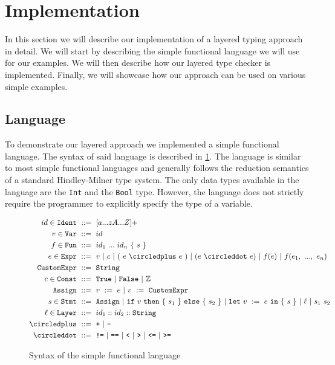 \section{Implementation}
\label{sec:implementation}

In this section we will describe our implementation of a layered typing approach in detail. We will start by describing the simple functional language we will use for our examples. We will then describe how our layered type checker is implemented. Finally, we will showcase how our approach can be used on various simple examples.

\subsection{Language}
\label{ssec:language}

To demonstrate our layered approach we implemented a simple functional language. The syntax of said language is described in \ref{fig:lang}. The language is similar to most simple functional languages and generally follows the reduction semantics of a standard Hindley-Milner type system. The only data types available in the language are the \texttt{Int} and the \texttt{Bool} type. However, the language does not strictly require the programmer to explicitly specify the type of a variable.

\begin{figure}[ht!]
\begin{align*}
	id \in \texttt{Ident}\ 	&::=\ [a...zA...Z]+ \\
	v \in \texttt{Var}\ 	&::=\ id \\
	f \in \texttt{Fun}\ 	&::=\ id_1\ ...\ id_n\ \{\ s\ \}\\
	e \in \texttt{Expr}\ 	&::=\ v\ |\ c\ |\ (\ e\ \circledplus\ e\ )\ |\ (e\ \circleddot\ e)\ |\ f(e)\ |\ f(e_1,\ ...,\ e_n)  \\
	\texttt{CustomExpr}\ 	&::=\ \texttt{String}\\
	c \in \texttt{Const}\ 	&::=\ \texttt{True}\ |\ \texttt{False}\ |\ \mathbb{Z} \\
	\texttt{Assign}\ 	&::=\ v\ :=\ e\ |\ v\ :=\ \texttt{CustomExpr}\ \\
	s \in \texttt{Stmt}\ 	&::=\ \texttt{Assign}\ |\ \texttt{if}\ v\ \texttt{then}\ \lbrace\ s_1\ \rbrace\ \texttt{else}\ \lbrace\ s_2\ \rbrace\ |\ \texttt{let}\ v\ :=\ e\ \texttt{in}\ \lbrace\ s\ \rbrace\ |\ \ell\ |\ s_1\ s_2\ \\
	\ell \in \texttt{Layer}\ 	&::=\ id_1::id_2::\texttt{String} \\
	\circledplus\ 		&::=\ \texttt{+}\ |\ \texttt{-} \\
	\circleddot\ 		&::=\ \texttt{!=}\ |\ \texttt{==}\ |\ \texttt{<} \ |\ \texttt{>} \ |\ \texttt{<=} \ |\ \texttt{>=} \\
\end{align*}
\caption{Syntax of the simple functional language}
\label{fig:lang}
\end{figure}

